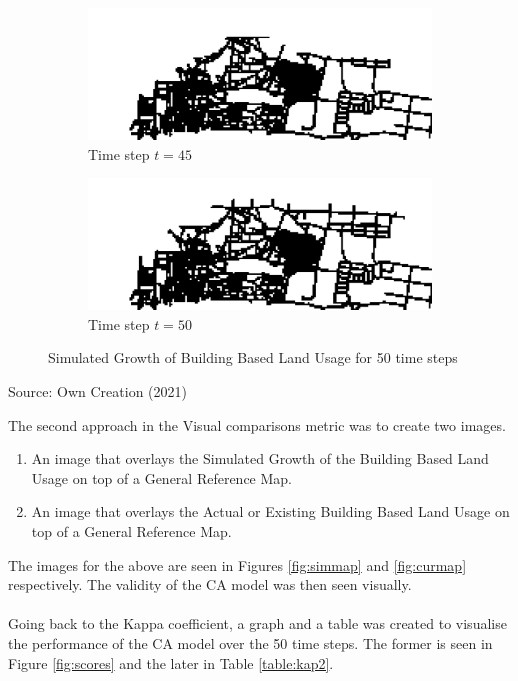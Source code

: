 \begin{figure}[H]
\begin{subfigure}{.5\textwidth}
  \centering
  \includegraphics[width=1\linewidth]{Figures/Chapter4/generation-45-melusi}
  \caption{Time step $t = 45$}
\end{subfigure}
\begin{subfigure}{.5\textwidth}
  \centering
  \includegraphics[width=1\linewidth]{Figures/Chapter4/generation-50-melusi}
  \caption{Time step $t = 50$}
\end{subfigure}
\caption{Simulated Growth of Building Based Land Usage for 50 time steps}
\label{fig:gen50}
\end{figure}
\begin{center}
Source: Own Creation (2021)
\end{center}
The second approach in the Visual comparisons metric was to create two images.
\begin{enumerate}
\item An image that overlays the Simulated Growth of the Building Based Land Usage on top of a General Reference Map.
\item An image that overlays the Actual or Existing Building Based Land Usage on top of a General Reference Map.
\end{enumerate}
The images for the above are seen in Figures \ref{fig:simmap} and \ref{fig:curmap} respectively. The validity of the CA model was then seen visually.
\\\\
Going back to the Kappa coefficient, a graph and a table was created to visualise the performance of the CA model over the 50 time steps. The former is seen in Figure \ref{fig:scores} and the later in Table \ref{table:kap2}.

